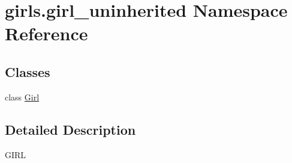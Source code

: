 \hypertarget{namespacegirls_1_1girl__uninherited}{}\section{girls.\+girl\+\_\+uninherited Namespace Reference}
\label{namespacegirls_1_1girl__uninherited}
\subsection*{Classes}
\begin{DoxyCompactItemize}
\item 
class \hyperlink{classgirls_1_1girl__uninherited_1_1_girl}{Girl}
\end{DoxyCompactItemize}


\subsection{Detailed Description}
\begin{DoxyVerb}GIRL\end{DoxyVerb}
 